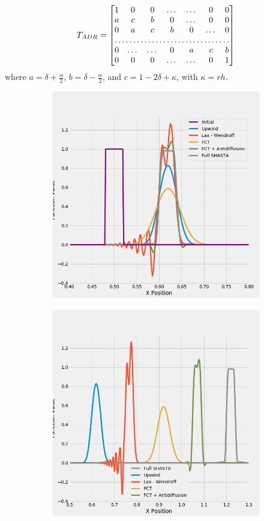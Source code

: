 \documentclass[]{article}
\begin{document}
{\begin{equation}
T_{ADR}=\begin{bmatrix} 
1       & 0 & 0 &\dots& \dots &0&0 \\
a      & c & b & 0&\dots & 0 &0\\
0& a & c & b & 0 &\dots & 0 \\
\hdotsfor{7} \\
0 &\dots & \dots & 0&a & c & b  \\
0     &0  & 0 & \dots&\dots & 0&1
\end{bmatrix}
\label{eq:T_Diffusion_2}
\end{equation}
where $a = \delta +\frac{\alpha}{2}$, $b =\delta-\frac{\alpha}{2}$, and $c=1-2\delta +\kappa$, with $\kappa = r h$. 


\begin{figure}
	\begin{subfigure}{.5\textwidth}
		\centering
		\includegraphics[width=.8\linewidth]{figures/constU_fCompare.png}
		\caption{}
	\end{subfigure}%
	\begin{subfigure}{.5\textwidth}
		\centering
		\includegraphics[width=.8\linewidth]{figures/constU_fCompare_offset.png}

\end{subfigure}
\end{figure}}
\end{document}
